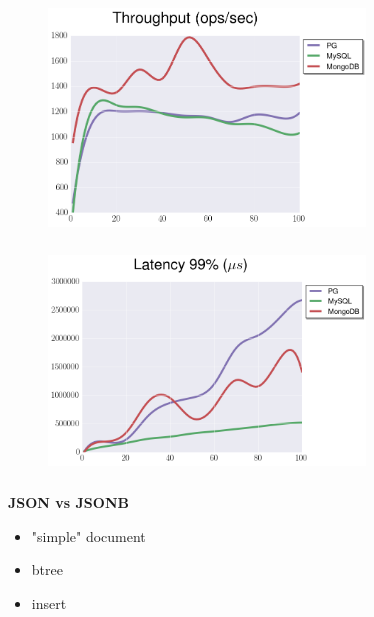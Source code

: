 \documentclass[usenames,dvipsnames, 18pt, compress, aspectratio=169]{beamer}
\begin{document}
\begin{frame}
    \frametitle{}
    \begin{center}
    \begin{figure}
        \includegraphics[width=0.75\textwidth,center]{benchmarks/update_btree_large_throughput.png}
    \end{figure}
    \end{center}
\end{frame}

\begin{frame}
    \frametitle{}
    \begin{center}
    \begin{figure}
        \includegraphics[width=0.75\textwidth,center]{benchmarks/update_btree_large_latency.png}
    \end{figure}
    \end{center}
\end{frame}

\begin{frame}
    \frametitle{}
    \begin{center}
        \textbf{JSON vs JSONB}
        \begin{itemize}[label={}]
            \item "simple" document
            \item btree
            \item insert
        \end{itemize}
    \end{center}
\end{frame}
\end{document}
